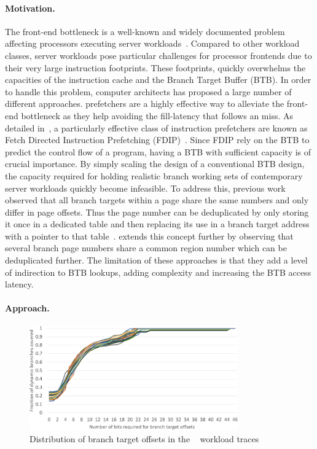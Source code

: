 \documentclass[../main.tex]{subfiles}
\begin{document}
\begin{refsection}
\paragraph{Motivation.}
The front-end bottleneck is a well-known and widely documented problem
affecting processors executing server
workloads~\cite{ailamaki99_dbmss_moder_proces,ferdman12_clear_cloud,kanev15_profil,ayers19_asmdb}. Compared
to other workload classes, server workloads pose particular challenges
for processor frontends due to their very large instruction
footprints. These footprints, quickly overwhelms the capacities of the
instruction cache  and the Branch Target Buffer (BTB). In order to
handle this problem, computer architects has proposed a large number
of different approaches.  prefetchers are a highly effective way
to alleviate the front-end bottleneck as they help avoiding the
fill-latency that follows an  miss.  As detailed
in~, a particularly effective class of
instruction prefetchers are known as Fetch Directed Instruction
Prefetching (FDIP)~\cite{reinman99_fetch_direc_instr_prefet}. Since
FDIP rely on the BTB to predict the control flow of a program, having
a BTB with sufficient capacity is of crucial importance. By simply
scaling the design of a conventional BTB design, the capacity required
for holding realistic branch working sets of contemporary server
workloads quickly become infeasible. To address this, previous work
observed that all branch targets within a page share the same numbers
and only differ in page offsets. Thus the page number can be
deduplicated by only storing it once in a dedicated table and then
replacing its use in a branch target address with a pointer to that
table~\cite{seznec96_dont_use_page_number_point_it}. \textcite{soundararajan21_pdede}
extends this concept further by observing that several branch page
numbers share a common region number which can be deduplicated
further. The limitation of these approaches is that they add a level
of indirection to BTB lookups, adding complexity and increasing the
BTB access latency.


\paragraph{Approach.}

\begin{figure}[ht]
  \centering
  \includegraphics[width=0.8\textwidth]{figures/offset_distribution.pdf}
  \caption{\label{fig:offset-distr} Distribution of branch target offsets in the ~\cite{ipc1} workload traces}
\end{figure}


\end{refsection}
\end{document}
